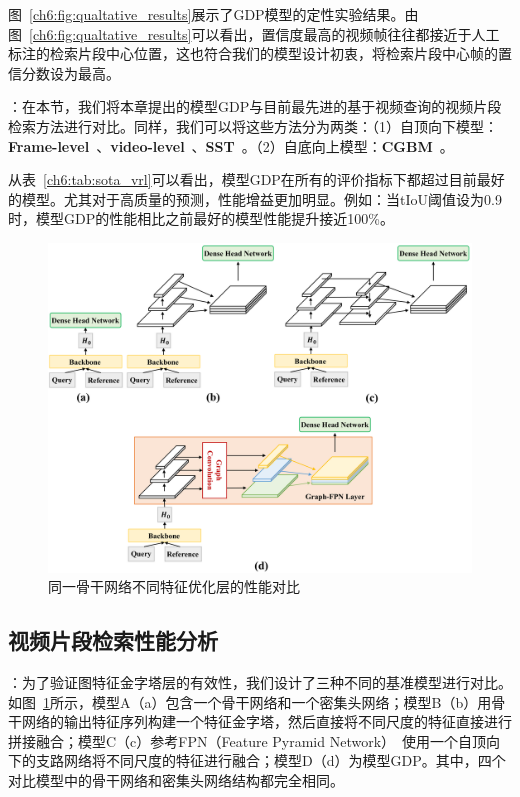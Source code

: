 图~\ref{ch6:fig:qualtative_results}展示了GDP模型的定性实验结果。由图~\ref{ch6:fig:qualtative_results}可以看出，置信度最高的视频帧往往都接近于人工标注的检索片段中心位置，这也符合我们的模型设计初衷，将检索片段中心帧的置信分数设为最高。


\textbf{}：在本节，我们将本章提出的模型GDP与目前最先进的基于视频查询的视频片段检索方法进行对比。同样，我们可以将这些方法分为两类：（1）自顶向下模型：\textbf{Frame-level}~\cite{feng2018video}、\textbf{video-level}~\cite{feng2018video}、\textbf{SST}~\cite{buch2017sst}。（2）自底向上模型：\textbf{CGBM}~\cite{feng2018video}。

从表~\ref{ch6:tab:sota_vrl}可以看出，模型GDP在所有的评价指标下都超过目前最好的模型。尤其对于高质量的预测，性能增益更加明显。例如：当tIoU阈值设为0.9时，模型GDP的性能相比之前最好的模型性能提升接近100\%。


\begin{figure}[tbp]
    \centering
    \includegraphics[width=0.9\linewidth]{chapter6/res/ablative_backbone.pdf}
    \caption{同一骨干网络不同特征优化层的性能对比}
    \label{ch6:fig:ablative_backbone}
\end{figure}


\subsection{视频片段检索性能分析}

\textbf{}：为了验证图特征金字塔层的有效性，我们设计了三种不同的基准模型进行对比。如图~\ref{ch6:fig:ablative_backbone}所示，模型A（a）包含一个骨干网络和一个密集头网络；模型B（b）用骨干网络的输出特征序列构建一个特征金字塔，然后直接将不同尺度的特征直接进行拼接融合；模型C（c）参考FPN（Feature Pyramid Network）~\cite{lin2017feature}使用一个自顶向下的支路网络将不同尺度的特征进行融合；模型D（d）为模型GDP。其中，四个对比模型中的骨干网络和密集头网络结构都完全相同。

